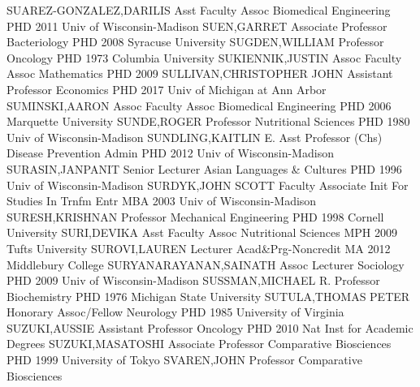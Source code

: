 \documentclass[
]{article}
\begin{document}
\textbar SUAREZ-GONZALEZ,DARILIS \textbar Asst Faculty Assoc
\textbar Biomedical Engineering \textbar PHD 2011 Univ of
Wisconsin-Madison \textbar{}  \textbar SUEN,GARRET
\textbar Associate Professor \textbar Bacteriology \textbar PHD 2008
Syracuse University \textbar{}  \textbar SUGDEN,WILLIAM
\textbar Professor \textbar Oncology \textbar PHD 1973 Columbia
University \textbar{}  \textbar SUKIENNIK,JUSTIN
\textbar Assoc Faculty Assoc \textbar Mathematics \textbar PHD 2009
\textbar{}  \textbar SULLIVAN,CHRISTOPHER JOHN
\textbar Assistant Professor \textbar Economics \textbar PHD 2017 Univ
of Michigan at Ann Arbor \textbar{}  \textbar SUMINSKI,AARON
\textbar Assoc Faculty Assoc \textbar Biomedical Engineering
\textbar PHD 2006 Marquette University \textbar{} 
\textbar SUNDE,ROGER \textbar Professor \textbar Nutritional Sciences
\textbar PHD 1980 Univ of Wisconsin-Madison \textbar{} 
\textbar SUNDLING,KAITLIN E. \textbar Asst Professor (Chs)
\textbar Disease Prevention Admin \textbar PHD 2012 Univ of
Wisconsin-Madison \textbar{}  \textbar SURASIN,JANPANIT
\textbar Senior Lecturer \textbar Asian Languages \& Cultures
\textbar PHD 1996 Univ of Wisconsin-Madison \textbar{} 
\textbar SURDYK,JOHN SCOTT \textbar Faculty Associate \textbar Init For
Studies In Trnfm Entr \textbar MBA 2003 Univ of Wisconsin-Madison
\textbar{}  \textbar SURESH,KRISHNAN \textbar Professor
\textbar Mechanical Engineering \textbar PHD 1998 Cornell University
\textbar{}  \textbar SURI,DEVIKA \textbar Asst Faculty Assoc
\textbar Nutritional Sciences \textbar MPH 2009 Tufts University
\textbar{}  \textbar SUROVI,LAUREN \textbar Lecturer
\textbar Acad\&Prg-Noncredit \textbar MA 2012 Middlebury College
\textbar{}  \textbar SURYANARAYANAN,SAINATH \textbar Assoc
Lecturer \textbar Sociology \textbar PHD 2009 Univ of Wisconsin-Madison
\textbar{}  \textbar SUSSMAN,MICHAEL R. \textbar Professor
\textbar Biochemistry \textbar PHD 1976 Michigan State University
\textbar{}  \textbar SUTULA,THOMAS PETER \textbar Honorary
Assoc/Fellow \textbar Neurology \textbar PHD 1985 University of Virginia
\textbar{}  \textbar SUZUKI,AUSSIE \textbar Assistant
Professor \textbar Oncology \textbar PHD 2010 Nat Inst for Academic
Degrees \textbar{}  \textbar SUZUKI,MASATOSHI
\textbar Associate Professor \textbar Comparative Biosciences
\textbar PHD 1999 University of Tokyo \textbar{} 
\textbar SVAREN,JOHN \textbar Professor \textbar Comparative Biosciences
\end{document}

